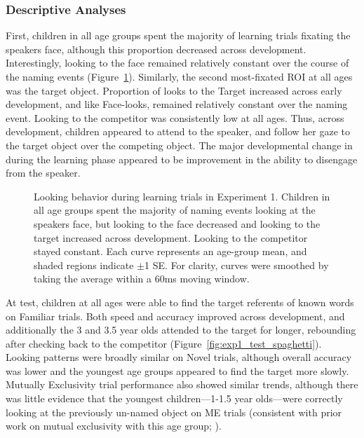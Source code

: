 \documentclass[man,floatsintext]{apa6}
\begin{document}
\subsubsection{Descriptive Analyses}

First, children in all age groups spent the majority of learning trials fixating the speakers face, although this proportion decreased across development. Interestingly, looking to the face remained relatively constant over the course of the naming events (Figure~\ref{fig:exp1_train_spaghetti}). Similarly, the second most-fixated ROI at all ages was the target object. Proportion of looks to the Target increased across early development, and like Face-looks, remained relatively constant over the naming event. Looking to the competitor was consistently low at all ages. Thus, across development, children appeared to attend to the speaker, and follow her gaze to the target object over the competing object. The major developmental change in during the learning phase appeared to be improvement in the ability to disengage from the speaker.

\begin{figure}[tb]
	\caption{\label{fig:exp1_train_spaghetti} Looking behavior during learning trials in Experiment 1. Children in all age groups spent the majority of naming events looking at the speakers face, but looking to the face decreased and looking to the target increased across development. Looking to the competitor stayed constant. Each curve represents an age-group mean, and shaded regions indicate $\pm$1 SE. For clarity, curves were smoothed by taking the average within a 60ms moving window.}
\end{figure}

At test, children at all ages were able to find the target referents of known words on Familiar trials. Both speed and accuracy improved across development, and additionally the 3 and 3.5 year olds attended to the target for longer, rebounding after checking back to the competitor (Figure~\ref{fig:exp1_test_spaghetti}). Looking patterns were broadly similar on Novel trials, although overall accuracy was lower and the youngest age groups appeared to find the target more slowly. Mutually Exclusivity trial performance also showed similar trends, although there was little evidence that the youngest children---1-1.5 year olds---were correctly looking at the previously un-named object on ME trials (consistent with prior work on mutual exclusivity with this age group; ).
\end{document}
